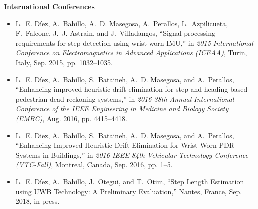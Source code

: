 \textbf{International Conferences}
\begin{itemize}
	\item L.~E. Díez, A.~Bahillo, A.~D. Masegosa, A.~Perallos, L.~Azpilicueta, F.~Falcone, J.~J. Astrain, and J.~Villadangos, ``Signal processing requirements for step detection using wrist-worn {IMU},'' in \emph{2015 {International} {Conference} on {Electromagnetics} in {Advanced} {Applications} ({ICEAA})}, Turin, Italy, Sep. 2015, pp. 1032--1035.
	\item L.~E. Díez, A.~Bahillo, S.~Bataineh, A.~D. Masegosa, and A.~Perallos, ``Enhancing improved heuristic drift elimination for step-and-heading based pedestrian dead-reckoning systems,'' in \emph{2016 38th {Annual} {International} {Conference} of the {IEEE} {Engineering} in {Medicine} and {Biology} {Society} ({EMBC})}, Aug. 2016, pp. 4415--4418.
	\item L.~E. Diez, A.~Bahillo, S.~Bataineh, A.~D. Masegosa, and A.~Perallos, ``Enhancing {Improved} {Heuristic} {Drift} {Elimination} for {Wrist}-{Worn} {PDR} {Systems} in {Buildings},'' in \emph{2016 {IEEE} 84th {Vehicular} {Technology} {Conference} ({VTC}-{Fall})}, Montreal, Canada, Sep. 2016, pp. 1--5.
	\item L.~E. Díez, A.~Bahillo, J.~Otegui, and T.~Otim, ``Step {Length} {Estimation} using {UWB} {Technology}: {A} {Preliminary} {Evaluation},'' Nantes, France, Sep. 2018, in press.
\end{itemize}

